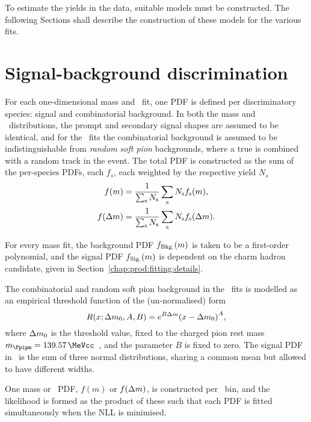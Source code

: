 To estimate the yields in the data, suitable models must be constructed.
The following Sections shall describe the construction of these models for the 
various fits.

\section{Signal-background discrimination}
\label{chap:prod:fitting:mass}

For each one-dimensional mass and \deltam\ fit, one PDF is defined per 
discriminatory species: signal and combinatorial background.
In both the mass and \deltam\ distributions, the prompt and secondary signal 
shapes are assumed to be identical, and for the \deltam\ fits the combinatorial 
background is assumed to be indistinguishable from \emph{random soft pion} 
backgrounds, where a true \PDzero is combined with a random track in the event.
The total \ac{PDF} is constructed as the sum of the per-species \acp{PDF}, each $f_{s}$, 
each weighted by the respective yield $N_{s}$
\begin{align}
  f(m) &= \frac{1}{\sum_{\textnormal{s}} N_{\textnormal{s}}}
          \sum_{\textnormal{s}} N_{\textnormal{s}}
          f_{\textnormal{s}}(m),\\
  f(\Delta{m}) &= \frac{1}{\sum_{\textnormal{s}} N_{\textnormal{s}}}
                \sum_{\textnormal{s}} N_{\textnormal{s}}
                f_{\textnormal{s}}(\Delta{m}).
\end{align}

For every mass fit, the background PDF $f_{\textnormal{Bkg.}}(m)$ is taken to 
be a first-order polynomial, and the signal PDF $f_{\textnormal{Sig.}}(m)$ is 
dependent on the charm hadron candidate, given in 
Section~\ref{chap:prod:fitting:details}.

The combinatorial and random soft pion background in the \deltam\ fits is 
modelled as an empirical threshold function of the (un-normalised) form
\begin{equation}
  R(x; \Delta{m}_{0}, A, B) = e^{B\Delta{m}}
    {(x - \Delta{m}_{0})}^A,
\end{equation}
where $\Delta{m}_{0}$ is the threshold value, fixed to the charged pion rest mass 
$m_{\Ppipm} = \SI{139.57}{\MeVcc}$~\cite{PDG2014}, and the parameter $B$ is 
fixed to zero.
The signal PDF in \deltam\ is the sum of three normal distributions, sharing a 
common mean but allowed to have different widths.

One mass or \deltam\ PDF, $f(m)$ or $f(\Delta{m})$, is constructed per \pTy\ bin, 
and the likelihood is formed as the product of these such that each PDF is 
fitted simultaneously when the \ac{NLL} is minimised.

